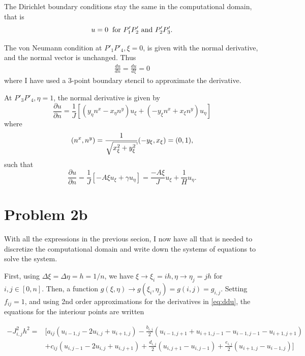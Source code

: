 \documentclass[aps, 12pt]{revtex4}
\newcommand{\hksqrt}[2][]{\ \mathpalette\DHLhksqrt{[#1]{#2\,}}}
\def\DHLhksqrt#1#2{\setbox0=\hbox{$#1\sqrt#2$}\dimen0=\ht0
    \advance\dimen0-0.3\ht0
    \setbox2=\hbox{\vrule height\ht0 depth -\dimen0}
    {\box0\lower0.65pt\box2}}
\begin{document}
The Dirichlet boundary conditions stay the same in the computational domain, that is
\begin{equation*}
    u = 0 \hspace{2mm} \text{for $P'_1P'_2$ and $P'_2P'_3$}.
\end{equation*}

The von Neumann condition at $P'_1P'_4, \xi=0$, is given with the normal derivative, and the normal vector is unchanged. Thus
\begin{align*}
    \frac{du}{dn} = \frac{du}{d\xi} = 0
\end{align*}
where I have used a 3-point boundary stencil to approximate the derivative.

At $P'_3P'_4, \eta=1$, the normal derivative is given by
\begin{equation*}
    \frac{\partial u}{\partial n} = \frac{1}{J} \left[(y_{\eta}n^x-x_{\eta}n^y)u_{\xi}+(-y_{\xi}n^x+x_{\xi}n^y)u_{\eta}\right]
\end{equation*}
where
\begin{equation*}
    (n^x, n^y)= \frac{1}{\hksqrt{x_{\xi}^2+y_{\xi}^2}}(-y_{\xi}, x_{\xi}) = (0, 1),
\end{equation*}
such that
\begin{equation*}
    \frac{\partial u}{\partial n} = \frac{1}{J}\left[-A\xi u_{\xi}+\gamma u_{\eta}\right] =\frac{-A\xi}{J}u_{\xi}+\frac{1}{H}u_{\eta}.
\end{equation*}

\section*{Problem 2b}
With all the expressions in the previous secion, I now have all that is needed to discretize the computational domain and write down the systems of equations to solve the system.

First, using $\Delta\xi=\Delta\eta=h=1/n$, we have $\xi\rightarrow\xi_i=ih, \eta\rightarrow\eta_j=jh$ for $i,j\in[0, n]$. Then, a function $g(\xi, \eta)\rightarrow g(\xi_i, \eta_j) = g(i, j) = g_{i,j}$. Setting $f_{ij} =1$, and using 2nd order approximations for the derivatives in \eqref{eq:ddu}, the equations for the interiour points are written

\begin{align*}
    -J_{i,j}^2h^2 = & \big[a_{ij}(u_{i-1, j}-2u_{i,j}+u_{i+1,j}) -\frac{b_{i,j}}{2}(u_{i-1,j+1}+u_{i+1,j-1}-u_{i-1,j-1}-u_{i+1,j+1})
    \\
                    & + c_{ij}(u_{i, j-1}-2u_{i,j}+u_{i,j+1}) + \frac{d_{i,j}}{2}(u_{i,j+1}-u_{i,j-1})+ \frac{e_{i,j}}{2}(u_{i+1,j}-u_{i-1,j})\big]
\end{align*}
\end{document}
